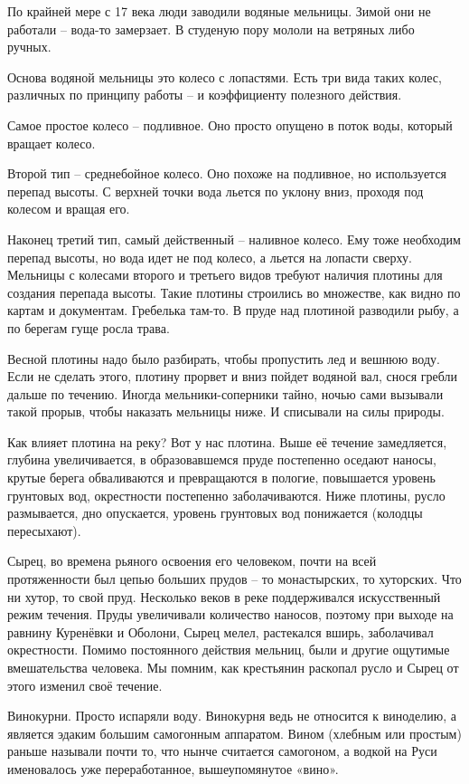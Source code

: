 По крайней мере с 17 века люди заводили водяные мельницы. Зимой они не работали – вода-то замерзает. В студеную пору мололи на ветряных либо ручных.

Основа водяной мельницы это колесо с лопастями. Есть три вида таких колес, различных по принципу работы – и коэффициенту полезного действия. 

Самое простое колесо – подливное. Оно просто опущено в поток воды, который вращает колесо. 

Второй тип – среднебойное колесо. Оно похоже на подливное, но используется перепад высоты. С верхней точки вода льется по уклону вниз, проходя под колесом и вращая его.

Наконец третий тип, самый действенный – наливное колесо. Ему тоже необходим перепад высоты, но вода идет не под колесо, а льется на лопасти сверху. Мельницы с колесами второго и третьего видов требуют наличия плотины для создания перепада высоты. Такие плотины строились во множестве, как видно по картам и документам. Гребелька там-то. В пруде над плотиной разводили рыбу, а по берегам гуще росла трава.

Весной плотины надо было разбирать, чтобы пропустить лед и вешнюю воду. Если не сделать этого, плотину прорвет и вниз пойдет водяной вал, снося гребли дальше по течению. Иногда мельники-соперники тайно, ночью сами вызывали такой прорыв, чтобы наказать мельницы ниже. И списывали на силы природы.

Как влияет плотина на реку? Вот у нас плотина. Выше её течение замедляется, глубина увеличивается, в образовавшемся пруде постепенно оседают наносы, крутые берега обваливаются и превращаются в пологие, повышается уровень грунтовых вод, окрестности постепенно заболачиваются. Ниже плотины, русло размывается, дно опускается, уровень грунтовых вод понижается (колодцы пересыхают).

Сырец, во времена рьяного освоения его человеком, почти на всей протяженности был цепью больших прудов – то монастырских, то хуторских. Что ни хутор, то свой пруд. Несколько веков в реке поддерживался искусственный режим течения. Пруды увеличивали количество наносов, поэтому при выходе на равнину Куренёвки и Оболони, Сырец мелел, растекался вширь, заболачивал окрестности. Помимо постоянного действия мельниц, были и другие ощутимые вмешательства человека. Мы помним, как крестьянин раскопал русло и Сырец от этого изменил своё течение.

Винокурни. Просто испаряли воду. Винокурня ведь не относится к виноделию, а является эдаким большим самогонным аппаратом. Вином (хлебным или простым) раньше называли почти то, что нынче считается самогоном, а водкой на Руси именовалось уже переработанное, вышеупомянутое «вино».

